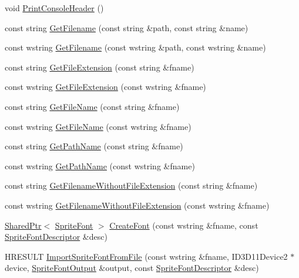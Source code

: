 \begin{DoxyCompactItemize}
\item 
void \hyperlink{namespacemage_a064756443bd8a1af6974f22c81d29ed0}{Print\+Console\+Header} ()
\item 
const string \hyperlink{namespacemage_aa85467b1af6c9f14e93178cbfd6ca022}{Get\+Filename} (const string \&path, const string \&name)
\item 
const wstring \hyperlink{namespacemage_a42580a2b02794193143aea32e3c815b5}{Get\+Filename} (const wstring \&path, const wstring \&name)
\item 
const string \hyperlink{namespacemage_a4da638506a9dda4f16c41a1a00c0d0e1}{Get\+File\+Extension} (const string \&fname)
\item 
const wstring \hyperlink{namespacemage_a2818c96634f4c8d49dcc4144395b24ef}{Get\+File\+Extension} (const wstring \&fname)
\item 
const string \hyperlink{namespacemage_a167010e334287f9369b15564802a770b}{Get\+File\+Name} (const string \&fname)
\item 
const wstring \hyperlink{namespacemage_ac643523ad89ca58419a2cac93912693b}{Get\+File\+Name} (const wstring \&fname)
\item 
const string \hyperlink{namespacemage_ab3642c6ef6cf94a62fb37b40c3c2f57e}{Get\+Path\+Name} (const string \&fname)
\item 
const wstring \hyperlink{namespacemage_ad23faa6d1854d389eb37fbdeefe97361}{Get\+Path\+Name} (const wstring \&fname)
\item 
const string \hyperlink{namespacemage_ab8841cbab507ef81edb00278110553ad}{Get\+Filename\+Without\+File\+Extension} (const string \&fname)
\item 
const wstring \hyperlink{namespacemage_aac01c0fba57d6737fcf32155748e95b0}{Get\+Filename\+Without\+File\+Extension} (const wstring \&fname)
\item 
\hyperlink{namespacemage_a1e01ae66713838a7a67d30e44c67703e}{Shared\+Ptr}$<$ \hyperlink{classmage_1_1_sprite_font}{Sprite\+Font} $>$ \hyperlink{namespacemage_ac93dae3a8755fa1e1c9be6c8aa0e07d2}{Create\+Font} (const wstring \&fname, const \hyperlink{structmage_1_1_sprite_font_descriptor}{Sprite\+Font\+Descriptor} \&desc)
\item 
H\+R\+E\+S\+U\+LT \hyperlink{namespacemage_a08f20ffe7bbb23d861ab2442e2967bcd}{Import\+Sprite\+Font\+From\+File} (const wstring \&fname, I\+D3\+D11\+Device2 $\ast$device, \hyperlink{structmage_1_1_sprite_font_output}{Sprite\+Font\+Output} \&output, const \hyperlink{structmage_1_1_sprite_font_descriptor}{Sprite\+Font\+Descriptor} \&desc)
\item 

\end{DoxyCompactItemize}

